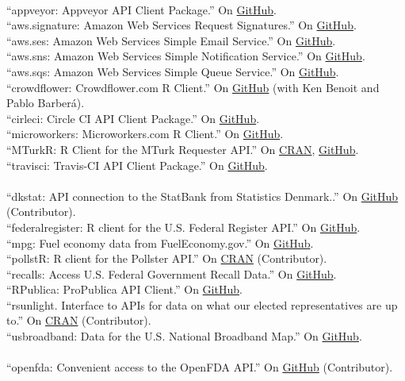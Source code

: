 \documentclass[12pt]{article}
\newcommand{\topic}[1]{\pagebreak[3]\indent {\color{lg}{\footnotesize #1 }}\\}
\newcommand{\entry}[1]{\indent {\color{lg}\guillemotright}\hspace{2pt}#1\vspace{.25em}\\}
\begin{document}
\topic{R packages contributed to the cloudyr project}
\entry{``appveyor: Appveyor API Client Package.'' On \href{https://github.com/cloudyr/appveyor}{GitHub}.}
\entry{``aws.signature: Amazon Web Services Request Signatures.'' On \href{https://github.com/cloudyr/aws.signature}{GitHub}.}
\entry{``aws.ses: Amazon Web Services Simple Email Service.'' On \href{https://github.com/cloudyr/aws.ses}{GitHub}.}
\entry{``aws.sns: Amazon Web Services Simple Notification Service.'' On \href{https://github.com/cloudyr/aws.sns}{GitHub}.}
\entry{``aws.sqs: Amazon Web Services Simple Queue Service.'' On \href{https://github.com/cloudyr/aws.sqs}{GitHub}.}
\entry{``crowdflower: Crowdflower.com R Client.'' On \href{https://github.com/cloudyr/crowdflower}{GitHub} (with Ken Benoit and Pablo Barber\'{a}).}
\entry{``cirleci: Circle CI API Client Package.'' On \href{https://github.com/cloudyr/circleci}{GitHub}.}
\entry{``microworkers: Microworkers.com R Client.'' On \href{https://github.com/leeper/microworkers}{GitHub}.}
\entry{``MTurkR: R Client for the MTurk Requester API.'' On \href{https://cran.r-project.org/package=MTurkR}{CRAN}, \href{https://github.com/leeper/MTurkR}{GitHub}.}
\entry{``travisci: Travis-CI API Client Package.'' On \href{https://github.com/cloudyr/travisci}{GitHub}.}

\topic{R packages contributed to the rOpenGov project}
\entry{``dkstat: API connection to the StatBank from Statistics Denmark..'' On \href{https://github.com/rOpenGov/dkstat}{GitHub} (Contributor).}
\entry{``federalregister: R client for the U.S. Federal Register API.'' On \href{https://github.com/rOpenGov/federalregister}{GitHub}.}
\entry{``mpg: Fuel economy data from FuelEconomy.gov.'' On \href{https://github.com/rOpenGov/mpg}{GitHub}.}
\entry{``pollstR: R client for the Pollster API.'' On \href{https://cran.r-project.org/package=pollstR}{CRAN} (Contributor).}
\entry{``recalls: Access U.S. Federal Government Recall Data.'' On \href{https://github.com/rOpenGov/recalls}{GitHub}.}
\entry{``RPublica: ProPublica API Client.'' On \href{https://github.com/rOpenGov/RPublica}{GitHub}.}
\entry{``rsunlight. Interface to APIs for data on what our elected representatives are up to.'' On \href{https://cran.r-project.org/package=rsunlight}{CRAN} (Contributor).}
\entry{``usbroadband: Data for the U.S. National Broadband Map.'' On \href{https://github.com/rOpenGov/usbroadband}{GitHub}.}

\topic{R packages contributed to the rOpenHealth project}
\entry{``openfda: Convenient access to the OpenFDA API.'' On \href{https://github.com/ropenhealth/openfda}{GitHub} (Contributor).}
\end{document}
